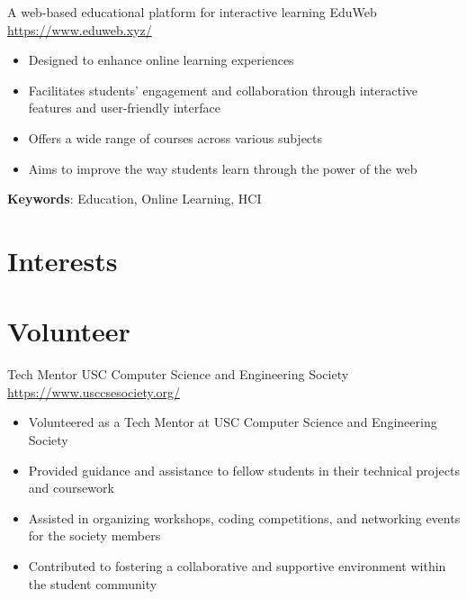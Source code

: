 \documentclass[a4paper, serif, 10pt]{moderncv}
\begin{document}
        {A web-based educational platform for interactive learning}
        {EduWeb}
        {\url{https://www.eduweb.xyz/}}
        {}
        {\begin{itemize}
\item Designed to enhance online learning experiences
\item Facilitates students' engagement and collaboration through interactive features and user-friendly interface
\item Offers a wide range of courses across various subjects
\item Aims to improve the way students learn through the power of the web
\end{itemize}
\textbf{Keywords}: Education, Online Learning, HCI}
\section{Interests}

\section{Volunteer}

        {Tech Mentor}
        {USC Computer Science and Engineering Society}
        {\url{https://www.usccsesociety.org/}}
        {}
        {\begin{itemize}
\item Volunteered as a Tech Mentor at USC Computer Science and Engineering Society
\item Provided guidance and assistance to fellow students in their technical projects and coursework
\item Assisted in organizing workshops, coding competitions, and networking events for the society members
\item Contributed to fostering a collaborative and supportive environment within the student community
\end{itemize}}
    
\end{document}
